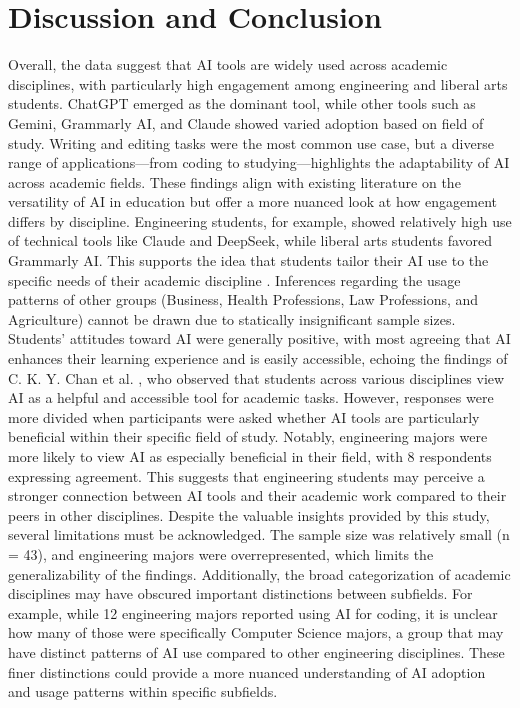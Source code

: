 \documentclass[12pt]{article}
\begin{document}
\section{Discussion and Conclusion}
\label{sec:discussion_and_conclusion}
Overall, the data suggest that AI tools are widely used across academic disciplines, with particularly high engagement among engineering and liberal arts students. ChatGPT emerged as the dominant tool, while other tools such as Gemini, Grammarly AI, and Claude showed varied adoption based on field of study. Writing and editing tasks were the most common use case, but a diverse range of applications—from coding to studying—highlights the adaptability of AI across academic fields.
These findings align with existing literature on the versatility of AI in education \cite{pedro, md} but offer a more nuanced look at how engagement differs by discipline. Engineering students, for example, showed relatively high use of technical tools like Claude and DeepSeek, while liberal arts students favored Grammarly AI. This supports the idea that students tailor their AI use to the specific needs of their academic discipline \cite{lin}. Inferences regarding the usage patterns of other groups (Business, Health Professions, Law Professions, and Agriculture) cannot be drawn due to statically insignificant sample sizes.
Students’ attitudes toward AI were generally positive, with most agreeing that AI enhances their learning experience and is easily accessible, echoing the findings of C. K. Y. Chan et al. \cite{chan}, who observed that students across various disciplines view AI as a helpful and accessible tool for academic tasks. However, responses were more divided when participants were asked whether AI tools are particularly beneficial within their specific field of study. Notably, engineering majors were more likely to view AI as especially beneficial in their field, with 8 respondents expressing agreement. This suggests that engineering students may perceive a stronger connection between AI tools and their academic work compared to their peers in other disciplines.
Despite the valuable insights provided by this study, several limitations must be acknowledged. The sample size was relatively small (n = 43), and engineering majors were overrepresented, which limits the generalizability of the findings. Additionally, the broad categorization of academic disciplines may have obscured important distinctions between subfields. For example, while 12 engineering majors reported using AI for coding, it is unclear how many of those were specifically Computer Science majors, a group that may have distinct patterns of AI use compared to other engineering disciplines. These finer distinctions could provide a more nuanced understanding of AI adoption and usage patterns within specific subfields.
\end{document}
